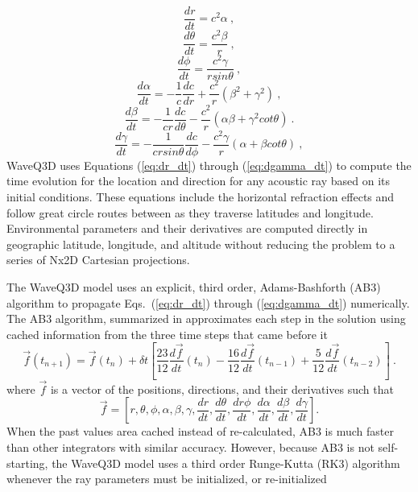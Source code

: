 \documentclass{ws-jca}
\newcommand{\twoDxN}{Nx2\nobreakdash\textendash D }
\begin{document}
\begin{equation}
	\frac{dr}{dt} = c^2 \alpha \:,
	\label{eq:dr_dt}
\end{equation}
\begin{equation}
	\frac{d\theta}{dt} = \frac{c^2 \beta}{r} \:,
	\label{eq:dtheta_dt}
\end{equation}
\begin{equation}
	\frac{d\phi}{dt} = \frac{c^2\gamma}{r sin\theta} \:,
	\label{eq:dphi_dt}
\end{equation}
\begin{equation}
	\frac{d\alpha}{dt} = -\frac{1}{c}\frac{dc}{dr} 
		+ \frac{c^2}{r}\left( \beta^2 + \gamma^2 \right) \:,
	\label{eq:dalpha_dt}
\end{equation}
\begin{equation}
	\frac{d\beta}{dt} = -\frac{1}{cr}\frac{dc}{d\theta} 
		- \frac{c^2}{r} \left( \alpha \beta + \gamma^2 cot\theta \right) \:.
	\label{eq:dbeta_dt}
\end{equation}
\begin{equation}
	\frac{d\gamma}{dt} = -\frac{1}{cr sin\theta}\frac{dc}{d\phi} 
		- \frac{c^2 \gamma}{r} \left( \alpha + \beta cot\theta \right) \:,
	\label{eq:dgamma_dt}
\end{equation}
WaveQ3D uses Equations (\ref{eq:dr_dt}) through (\ref{eq:dgamma_dt}) to compute the time evolution for the location and direction for any acoustic ray based on its initial conditions. These equations include the horizontal refraction effects and follow great circle routes between
as they traverse latitudes and longitude. Environmental parameters and their derivatives are computed directly in geographic latitude, longitude, and altitude without reducing the problem to a series of \twoDxN Cartesian projections.

The WaveQ3D model uses an explicit, third order, Adams-Bashforth (AB3) algorithm\cite{Yakowitz1986} to propagate Eqs.~(\ref{eq:dr_dt}) through (\ref{eq:dgamma_dt}) numerically. The AB3 algorithm, summarized in approximates each step in the solution using cached information from the three time steps that came before it
\begin{equation}
	\vec{f}(t_{n+1}) = \vec{f} (t_{n}) + \delta t \left[ 
		\frac{23}{12} \frac{d\vec{f}}{dt}(t_n)
	  	- \frac{16}{12} \frac{d\vec{f}}{dt}(t_{n-1}) 
	  	+ \frac{5}{12} \frac{d\vec{f}}{dt}(t_{n-2}) \right] \:.
	\label{eq:AB3_algorithm}
\end{equation}
where $\vec{f}$ is a vector of the positions, directions, and their derivatives such that
\begin{equation}
	\vec{f} = \left[ r, \theta, \phi, \alpha, \beta, \gamma, \frac{dr}{dt}, \frac{d\theta}{dt}, \frac{dr\phi}{dt}, 
		\frac{d\alpha}{dt}, \frac{d\beta}{dt}, \frac{d\gamma}{dt} \right] .
\end{equation}
When the past values area cached instead of re-calculated, AB3 is much faster
than other integrators with similar accuracy. However, because AB3 is not self-starting,
the WaveQ3D model uses a third order Runge-Kutta (RK3) algorithm\cite{Press1992}
whenever the ray parameters must be initialized, or re-initialized
\end{document}
